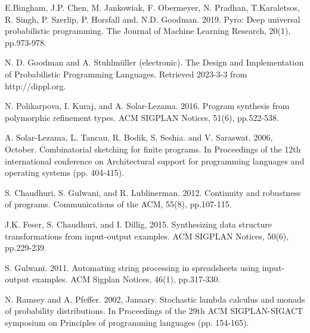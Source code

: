 \documentclass[runningheads]{llncs}
\begin{document}
\begin{thebibliography}{8}

E.Bingham, J.P. Chen, M. Jankowiak, F. Obermeyer, N. Pradhan, T.Karaletsos, R. Singh, P. Szerlip, P. Horsfall and, N.D. Goodman. 2019. Pyro: Deep universal probabilistic programming. The Journal of Machine Learning Research, 20(1), pp.973-978.

N. D. Goodman and A. Stuhlmüller (electronic). The Design and Implementation of Probabilistic Programming Languages. Retrieved 2023-3-3 from http://dippl.org.

N. Polikarpova, I. Kuraj, and A. Solar-Lezama. 2016. Program synthesis from polymorphic refinement types. ACM SIGPLAN Notices, 51(6), pp.522-538.

A. Solar-Lezama, L. Tancau, R. Bodik, S. Seshia. and V. Saraswat. 2006, October. Combinatorial sketching for finite programs. In Proceedings of the 12th international conference on Architectural support for programming languages and operating systems (pp. 404-415).

S. Chaudhuri, S. Gulwani, and R. Lublinerman. 2012. Continuity and robustness of programs. Communications of the ACM, 55(8), pp.107-115.

J.K. Feser, S. Chaudhuri, and I. Dillig, 2015. Synthesizing data structure transformations from input-output examples. ACM SIGPLAN Notices, 50(6), pp.229-239.
    
S. Gulwani. 2011. Automating string processing in spreadsheets using input-output examples. ACM Sigplan Notices, 46(1), pp.317-330.

N. Ramsey and A. Pfeffer. 2002, January. Stochastic lambda calculus and monads of probability distributions. In Proceedings of the 29th ACM SIGPLAN-SIGACT symposium on Principles of programming languages (pp. 154-165).

\end{thebibliography}
\end{document}
